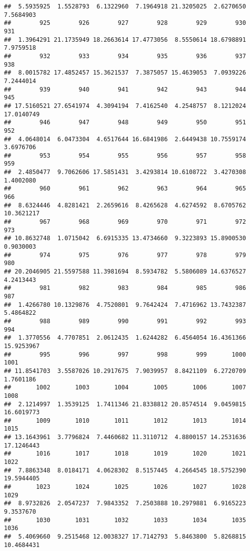 \documentclass[
]{article}
\begin{document}
\begin{verbatim}
##  5.5935925  1.5528793  6.1322960  7.1964918 21.3205025  2.6270650  7.5684903 
##        925        926        927        928        929        930        931 
##  1.3964291 21.1735949 18.2663614 17.4773056  8.5550614 18.6798891  7.9759518 
##        932        933        934        935        936        937        938 
##  8.0015782 17.4852457 15.3621537  7.3875057 15.4639053  7.0939226  7.2444014 
##        939        940        941        942        943        944        945 
## 17.5160521 27.6541974  4.3094194  7.4162540  4.2548757  8.1212024 17.0140749 
##        946        947        948        949        950        951        952 
##  4.0648014  6.0473304  4.6517644 16.6841986  2.6449438 10.7559174  3.6976706 
##        953        954        955        956        957        958        959 
##  2.4850477  9.7062606 17.5851431  3.4293814 10.6108722  3.4270308  1.4002080 
##        960        961        962        963        964        965        966 
##  8.6324446  4.8281421  2.2659616  8.4265628  4.6274592  8.6705762 10.3621217 
##        967        968        969        970        971        972        973 
## 10.8632748  1.0715042  6.6915335 13.4734660  9.3223893 15.8900530  0.9030003 
##        974        975        976        977        978        979        980 
## 20.2046905 21.5597588 11.3981694  8.5934782  5.5806089 14.6376527  4.2413443 
##        981        982        983        984        985        986        987 
##  1.4266780 10.1329876  4.7520801  9.7642424  7.4716962 13.7432387  5.4864822 
##        988        989        990        991        992        993        994 
##  1.3770556  4.7707851  2.0612435  1.6244282  6.4564054 16.4361366 15.9253967 
##        995        996        997        998        999       1000       1001 
## 11.8541703  3.5587026 10.2917675  7.9039957  8.8421109  6.2720709  1.7601186 
##       1002       1003       1004       1005       1006       1007       1008 
##  2.1214997  1.3539125  1.7411346 21.8338812 20.8574514  9.0459815 16.6019773 
##       1009       1010       1011       1012       1013       1014       1015 
## 13.1643961  3.7796824  7.4460682 11.3110712  4.8800157 14.2531636 17.1246443 
##       1016       1017       1018       1019       1020       1021       1022 
##  7.8863348  8.0184171  4.0628302  8.5157445  4.2664545 18.5752390 19.5944405 
##       1023       1024       1025       1026       1027       1028       1029 
##  8.9732826  2.0547237  7.9843352  7.2503888 10.2979881  6.9165223  9.3537670 
##       1030       1031       1032       1033       1034       1035       1036 
##  5.4069660  9.2515468 12.0038327 17.7142793  5.8463800  5.8268815 10.4684431 

\end{verbatim}
\end{document}
